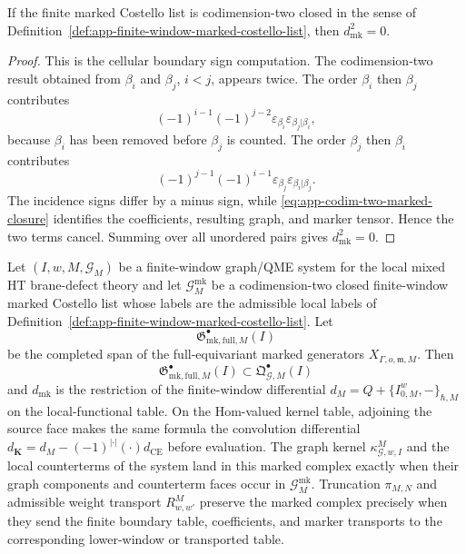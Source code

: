 \begin{lem}\label{lem:app-oriented-marked-incidence-signs}
  If the finite marked Costello list is codimension-two closed in the sense
  of Definition~\ref{def:app-finite-window-marked-costello-list}, then
  \(d_{\mathrm{mk}}^2=0\).
\end{lem}

\begin{proof}
  This is the cellular boundary sign computation.  The codimension-two
  result obtained from \(\beta_i\) and \(\beta_j\), \(i<j\), appears
  twice.  The order \(\beta_i\) then \(\beta_j\) contributes
  \[
    (-1)^{i-1}(-1)^{j-2}
    \varepsilon_{\beta_i}\varepsilon_{\beta_j|\beta_i},
  \]
  because \(\beta_i\) has been removed before \(\beta_j\) is counted.  The
  order \(\beta_j\) then \(\beta_i\) contributes
  \[
    (-1)^{j-1}(-1)^{i-1}
    \varepsilon_{\beta_j}\varepsilon_{\beta_i|\beta_j}.
  \]
  The incidence signs differ by a minus sign, while
  \eqref{eq:app-codim-two-marked-closure} identifies the coefficients,
  resulting graph, and marker tensor.  Hence the two terms cancel.  Summing
  over all unordered pairs gives \(d_{\mathrm{mk}}^2=0\).
\end{proof}

\begin{prop}
\label{prop:app-finite-window-marked-subcomplex-compatibility}
  Let \((I,w,M,\mathcal G_M)\) be a finite-window graph/QME system for
  the local mixed HT brane-defect theory and let
  \(\mathcal G^{\mathrm{mk}}_M\) be a codimension-two closed finite-window
  marked Costello list whose labels are the admissible local labels of
  Definition~\ref{def:app-finite-window-marked-costello-list}.  Let
  \[
    \mathfrak G^\bullet_{\mathrm{mk,full},M}(I)
  \]
  be the completed span of the full-equivariant marked generators
  \(X_{\Gamma,o,\mathfrak m,M}\).  Then
  \[
    \mathfrak G^\bullet_{\mathrm{mk,full},M}(I)
      \subset
    \mathfrak Q^\bullet_{\mathcal G,M}(I)
  \]
  and \(d_{\mathrm{mk}}\) is the restriction of the finite-window
  differential \(d_M=Q+\{I^w_{0,M},-\}_{\hbar,M}\) on the local-functional
  table.  On the Hom-valued kernel table, adjoining the source face makes
  the same formula the convolution differential
  \(d_{\mathbf K}=d_M-(-1)^{|\cdot|}(\cdot)d_{\mathrm{CE}}\) before
  evaluation.  The graph kernel
  \(\kappa^M_{\mathcal G,w,I}\) and the local counterterms of the system
  land in this marked complex exactly when their graph components and
  counterterm faces occur in \(\mathcal G^{\mathrm{mk}}_M\).  Truncation
  \(\pi_{M,N}\) and admissible weight transport \(R^M_{w,w'}\) preserve the
  marked complex precisely when they send the finite boundary table,
  coefficients, and marker transports to the corresponding lower-window or
  transported table.
\end{prop}

